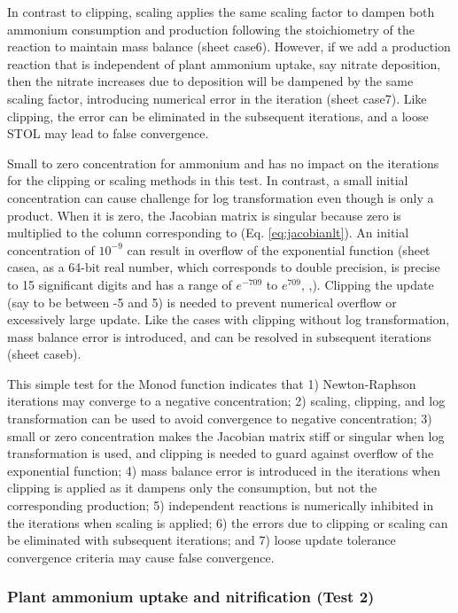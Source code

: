 \documentclass[gmd, manuscript]{copernicus}
\begin{document}
In contrast to clipping, scaling applies the same scaling factor to dampen both ammonium consumption and  production following the stoichiometry of the reaction to maintain mass balance (sheet case6). However, if we add a production reaction that is independent of plant ammonium uptake, say nitrate deposition, then the nitrate increases due to deposition will be dampened by the same scaling factor, introducing numerical error in the iteration (sheet case7). Like clipping, the error can be eliminated in the subsequent iterations, and a loose STOL may lead to false convergence.

Small to zero concentration for ammonium and  has no impact on the iterations for the clipping or scaling methods in this test. In contrast, a small initial  concentration can cause challenge for log transformation even though  is only a product. When it is zero, the Jacobian matrix is singular because zero is multiplied to the column corresponding to  (Eq. \ref{eq:jacobianlt}). An initial  concentration of $10^{-9}$ can result in overflow of the exponential function (sheet casea, as a 64-bit real number, which corresponds to double precision, is precise to 15 significant digits and has a range of $e^{-709}$ to $e^{709}$, \citeauthor{Lemmon2005},\citeyear{Lemmon2005}). Clipping the update (say to be between -5 and 5) is needed to prevent numerical overflow or excessively large update. Like the cases with clipping without log transformation, mass balance error is introduced, and can be resolved in subsequent iterations (sheet caseb).

This simple test for the Monod function indicates that 
1) Newton-Raphson iterations may converge to a negative concentration; 
2) scaling, clipping, and log transformation can be used to avoid convergence to negative concentration; 
3) small or zero concentration makes the Jacobian matrix stiff or singular when log transformation is used, and clipping is needed to guard against overflow of the exponential function; 
4) mass balance error is introduced in the iterations when clipping is applied as it dampens only the consumption, but not the corresponding production; 
5) independent reactions is numerically inhibited in the iterations when scaling is applied; 
6) the errors due to clipping or scaling can be eliminated with subsequent iterations; and
7) loose update tolerance convergence criteria may cause false convergence.

\subsubsection{Plant ammonium uptake and nitrification (Test 2)}
\end{document}

